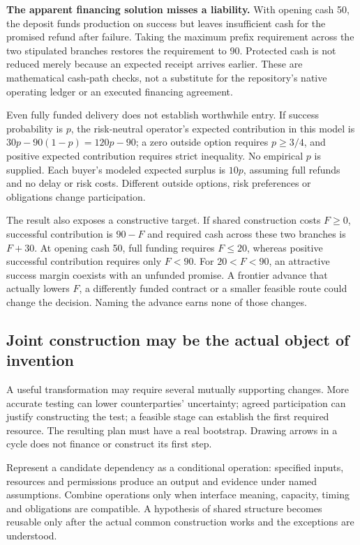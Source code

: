 \textbf{The apparent financing solution misses a liability.} With opening cash 50, the deposit funds production on success but leaves insufficient cash for the promised refund after failure. Taking the maximum prefix requirement across the two stipulated branches restores the requirement to 90. Protected cash is not reduced merely because an expected receipt arrives earlier. These are mathematical cash-path checks, not a substitute for the repository's native operating ledger or an executed financing agreement.

Even fully funded delivery does not establish worthwhile entry. If success probability is $p$, the risk-neutral operator's expected contribution in this model is $30p-90(1-p)=120p-90$; a zero outside option requires $p\geq3/4$, and positive expected contribution requires strict inequality. No empirical $p$ is supplied. Each buyer's modeled expected surplus is $10p$, assuming full refunds and no delay or risk costs. Different outside options, risk preferences or obligations change participation.

The result also exposes a constructive target. If shared construction costs $F\geq0$, successful contribution is $90-F$ and required cash across these two branches is $F+30$. At opening cash 50, full funding requires $F\leq20$, whereas positive successful contribution requires only $F<90$. For $20<F<90$, an attractive success margin coexists with an unfunded promise. A frontier advance that actually lowers $F$, a differently funded contract or a smaller feasible route could change the decision. Naming the advance earns none of those changes.

\subsection{Joint construction may be the actual object of invention}
A useful transformation may require several mutually supporting changes. More accurate testing can lower counterparties' uncertainty; agreed participation can justify constructing the test; a feasible stage can establish the first required resource. The resulting plan must have a real bootstrap. Drawing arrows in a cycle does not finance or construct its first step.

Represent a candidate dependency as a conditional operation: specified inputs, resources and permissions produce an output and evidence under named assumptions. Combine operations only when interface meaning, capacity, timing and obligations are compatible. A hypothesis of shared structure becomes reusable only after the actual common construction works and the exceptions are understood.

